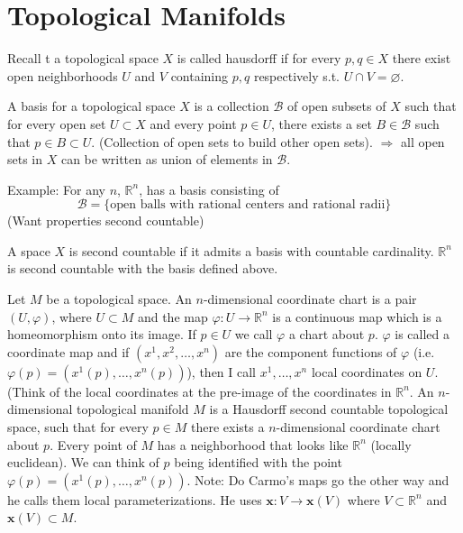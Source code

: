 \documentclass[a4paper]{article}
\begin{document}
\section*{Topological Manifolds}
Recall t a topological space $X$ is called hausdorff if for every $p,q \in X$ there exist open neighborhoods $U$ and $V$ containing $p,q$ respectively s.t. $U \cap V = \varnothing$.

A basis for a topological space $X$ is a collection $\mathcal{B}$ of open subsets of $X$ such that for  every open set $U \subset X$ and every point $p \in U$, there exists a set $B \in \mathcal{B}$ such that $p \in B \subset U$. (Collection of open sets to build other open sets). $\Rightarrow$ all open sets in $X$ can be written as union of elements in $\mathcal{B}$.

Example: For any $n$, $\mathds{R}^n$, has a basis consisting of 
\[
    \mathcal{B} = \{\text{open balls with rational centers and rational radii}\}
\]
(Want properties second countable)

A space $X$ is second countable if it admits a basis with countable cardinality. $\mathds{R}^n$ is second countable with the basis defined above.

Let $M$ be a topological space. An $n$-dimensional coordinate chart is a pair $(U, \varphi)$, where $U \subset M$ and the map $\varphi: U \rightarrow \mathds{R}^n$ is a continuous map which is a homeomorphism onto its image. If $p \in U$ we call $\varphi$ a chart about $p$. $\varphi$ is called a coordinate map and if $(x^1, x^2, \dots, x^n)$ are the component functions of $\varphi$ (i.e. $\varphi(p) = (x^1(p), \dots, x^n(p))$), then I call $x^1, \dots, x^n$ local coordinates on $U$. (Think of the local coordinates at the pre-image of the coordinates in $\mathds{R}^n$.
An $n$-dimensional topological manifold $M$ is a Hausdorff second countable topological space, such that for every $p \in M$ there exists a $n$-dimensional coordinate chart about $p$. Every point of $M$ has a neighborhood that looks like $\mathds{R}^n$ (locally euclidean). We can think of $p$ being identified with the point $\varphi(p) = (x^1(p), \dots, x^n(p))$. Note: Do Carmo's maps go the other way and he calls them local parameterizations. He uses $\mathbf{x} : V \rightarrow \mathbf{x}(V)$ where $V \subset \mathds{R}^n$ and $\mathbf{x}(V) \subset M$.
\end{document}

